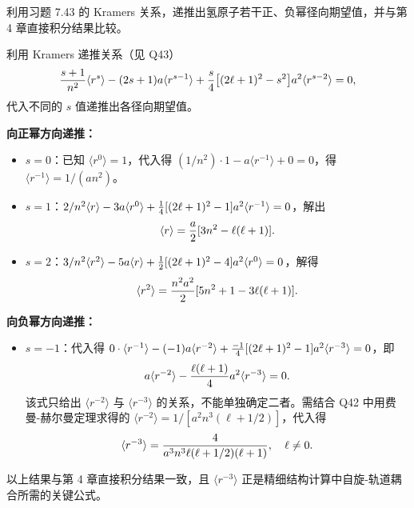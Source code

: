 \begin{question}
利用习题 7.43 的 Kramers 关系，递推出氢原子若干正、负幂径向期望值，并与第 4 章直接积分结果比较。
\end{question}
\begin{solution}
利用 Kramers 递推关系（见 Q43）
\[
{s+1\over n^2}\langle r^s\rangle - (2s+1)a\langle r^{s-1}\rangle + {s\over4}\bigl[(2\ell+1)^2-s^2\bigr]a^2\langle r^{s-2}\rangle = 0,
\]
代入不同的 $s$ 值递推出各径向期望值。

\textbf{向正幂方向递推：}
\begin{itemize}
\item $s=0$：已知 $\langle r^0\rangle=1$，代入得 $(1/n^2)\cdot1 - a\langle r^{-1}\rangle + 0=0$，得 $\langle r^{-1}\rangle=1/(an^2)$。
\item $s=1$：$2/n^2\langle r\rangle - 3a\langle r^0\rangle + {1\over4}[(2\ell+1)^2-1]a^2\langle r^{-1}\rangle = 0$，解出
  \[
  \langle r\rangle = {a\over2}[3n^2 - \ell(\ell+1)].
  \]
\item $s=2$：$3/n^2\langle r^2\rangle - 5a\langle r\rangle + {1\over2}[(2\ell+1)^2-4]a^2\langle r^0\rangle=0$，解得
  \[
  \langle r^2\rangle = {n^2a^2\over2}[5n^2+1-3\ell(\ell+1)].
  \]
\end{itemize}

\textbf{向负幂方向递推：}
\begin{itemize}
\item $s=-1$：代入得 $0\cdot\langle r^{-1}\rangle - (-1)a\langle r^{-2}\rangle + {-1\over4}[(2\ell+1)^2-1]a^2\langle r^{-3}\rangle=0$，即
  \[
  a\langle r^{-2}\rangle - {\ell(\ell+1)\over4}a^2\langle r^{-3}\rangle = 0.
  \]
  该式只给出 $\langle r^{-2}\rangle$ 与 $\langle r^{-3}\rangle$ 的关系，不能单独确定二者。需结合 Q42 中用费曼-赫尔曼定理求得的 $\langle r^{-2}\rangle=1/[a^2n^3(\ell+1/2)]$，代入得
  \[
  \langle r^{-3}\rangle = {4\over a^3 n^3\ell(\ell+1/2)(\ell+1)},\quad \ell\ne0.
  \]
\end{itemize}
以上结果与第 4 章直接积分结果一致，且 $\langle r^{-3}\rangle$ 正是精细结构计算中自旋-轨道耦合所需的关键公式。
\end{solution}

